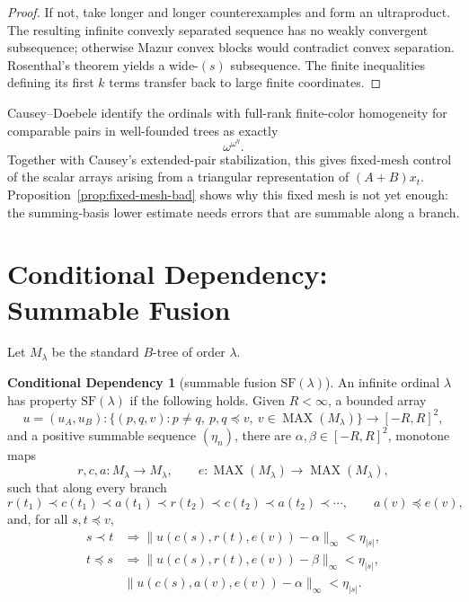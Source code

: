 \documentclass[11pt]{article}
\theoremstyle{definition}
\newtheorem{conditional}[theorem]{Conditional Dependency}
\theoremstyle{remark}
\newcommand{\MAX}{\operatorname{MAX}}
\begin{document}
\begin{proof}
If not, take longer and longer counterexamples and form an ultraproduct.
The resulting infinite convexly separated sequence has no weakly convergent
subsequence; otherwise Mazur convex blocks would contradict convex
separation.  Rosenthal's theorem yields a wide-\((s)\) subsequence.  The
finite inequalities defining its first \(k\) terms transfer back to large
finite coordinates.
\end{proof}

Causey--Doebele identify the ordinals with full-rank finite-color
homogeneity for comparable pairs in well-founded trees as exactly
\[
   \omega^{\omega^\eta}.
\]
Together with Causey's extended-pair stabilization, this gives fixed-mesh
control of the scalar arrays arising from a triangular representation of
\((A+B)x_t\).  Proposition~\ref{prop:fixed-mesh-bad} shows why this fixed
mesh is not yet enough: the summing-basis lower estimate needs errors that
are summable along a branch.

\section{Conditional Dependency: Summable Fusion}

Let \(M_\lambda\) be the standard \(B\)-tree of order \(\lambda\).

\begin{conditional}[summable fusion \(\mathrm{SF}(\lambda)\)]\label{cond:SF}
An infinite ordinal \(\lambda\) has property \(\mathrm{SF}(\lambda)\) if the
following holds.  Given \(R<\infty\), a bounded array
\[
u=(u_A,u_B):
\{(p,q,v):p\neq q,\ p,q\preceq v,\ v\in\MAX(M_\lambda)\}
\to[-R,R]^2,
\]
and a positive summable sequence \((\eta_n)\), there are
\(\alpha,\beta\in[-R,R]^2\), monotone maps
\[
 r,c,a:M_\lambda\to M_\lambda,\qquad
 e:\MAX(M_\lambda)\to\MAX(M_\lambda),
\]
such that along every branch
\[
r(t_1)\prec c(t_1)\prec a(t_1)\prec r(t_2)\prec c(t_2)\prec a(t_2)\prec\cdots,
\qquad a(v)\preceq e(v),
\]
and, for all \(s,t\preceq v\),
\[
\begin{array}{ll}
s\prec t &\Rightarrow
\|u(c(s),r(t),e(v))-\alpha\|_\infty<\eta_{|s|},\\[2mm]
t\preceq s &\Rightarrow
\|u(c(s),r(t),e(v))-\beta\|_\infty<\eta_{|s|},\\[2mm]
&\|u(c(s),a(v),e(v))-\alpha\|_\infty<\eta_{|s|}.
\end{array}
\]
\end{conditional}
\end{document}
